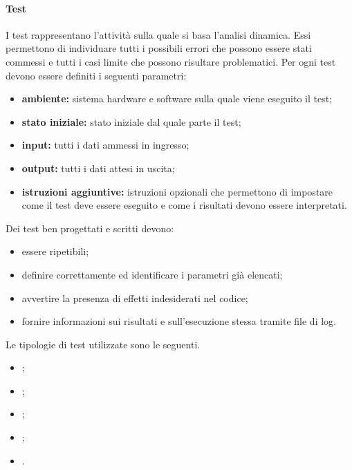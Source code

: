 \paragraph{Test}
\label{Test}
I test rappresentano l'attività sulla quale si basa l'analisi dinamica. Essi permettono di individuare tutti i possibili errori che possono essere stati commessi e tutti i casi limite che possono risultare problematici. Per ogni test devono essere definiti i seguenti parametri:
\begin{itemize}
	\item \textbf{ambiente:} sistema hardware e software sulla quale viene eseguito il test;
	\item \textbf{stato iniziale:} stato iniziale dal quale parte il test;
	\item \textbf{input:} tutti i dati ammessi in ingresso;
	\item \textbf{output:} tutti i dati attesi in uscita;
	\item \textbf{istruzioni aggiuntive:} istruzioni opzionali che permettono di impostare come il test deve essere eseguito e come i risultati devono essere interpretati.
\end{itemize}
Dei test ben progettati e scritti devono:
\begin{itemize}
	\item essere ripetibili;
	\item definire correttamente ed identificare i parametri già elencati;
	\item avvertire la presenza di effetti indesiderati nel codice;
	\item fornire informazioni sui risultati e sull'esecuzione stessa tramite file di log.
\end{itemize}
Le tipologie di test utilizzate sono le seguenti.
\begin{itemize}
	\item {};
	\item {};
	\item {};
	\item {};
	\item {}.
\end{itemize}
